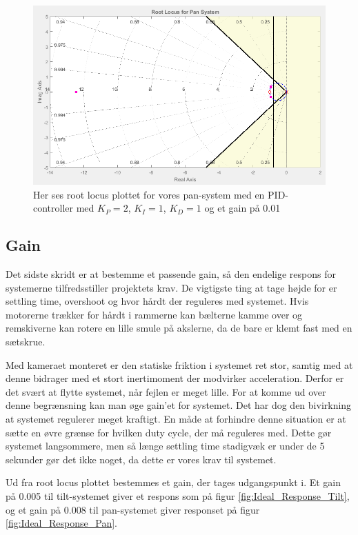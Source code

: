 \begin{figure}[ht]
	\begin{center}
		\includegraphics[scale=0.45]{Billeder/Pan_Rlocus.PNG}
	\end{center}
\caption{Her ses root locus plottet for vores pan-system med en PID-controller med $K_{P}=2$, $K_{I}=1$, $K_{D}=1$ og et gain på 0.01}
\label{fig:Pan_rlocus}
\end{figure}

\subsection{Gain}

Det sidste skridt er at bestemme et passende gain, så den endelige respons for systemerne tilfredsstiller projektets krav. De vigtigste ting at tage højde for er settling time, overshoot og hvor hårdt der reguleres med systemet. Hvis motorerne trækker for hårdt i rammerne kan bælterne kamme over og remskiverne kan rotere en lille smule på akslerne, da de bare er klemt fast med en sætskrue. 

Med kameraet monteret er den statiske friktion i systemet ret stor, samtig med at denne bidrager med et stort inertimoment der modvirker acceleration. Derfor er det svært at flytte systemet, når fejlen er meget lille. For at komme ud over denne begrænsning kan man øge gain'et for systemet. Det har dog den bivirkning at systemet regulerer meget kraftigt. En måde at forhindre denne situation er at sætte en øvre grænse for hvilken duty cycle, der må reguleres med. Dette gør systemet langsommere, men så længe settling time stadigvæk er under de 5 sekunder gør det ikke noget, da dette er vores krav til systemet.

Ud fra root locus plottet bestemmes et gain, der tages udgangspunkt i. Et gain på 0.005 til tilt-systemet giver et respons som på figur \ref{fig:Ideal_Response_Tilt}, og et gain på 0.008 til pan-systemet giver responset på figur \ref{fig:Ideal_Response_Pan}. 

